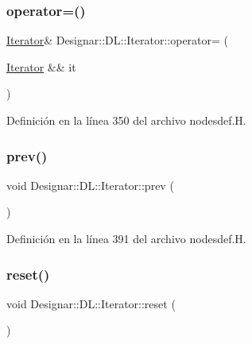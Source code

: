 \subsubsection{\texorpdfstring{operator=()}{operator=()}\hspace{0.1cm}{\footnotesize\ttfamily [2/2]}}
{\footnotesize\ttfamily \hyperlink{class_designar_1_1_d_l_1_1_iterator}{Iterator}\& Designar\+::\+D\+L\+::\+Iterator\+::operator= (\begin{DoxyParamCaption}\item[{\hyperlink{class_designar_1_1_d_l_1_1_iterator}{Iterator} \&\&}]{it }\end{DoxyParamCaption})\hspace{0.3cm}{\ttfamily [inline]}}



Definición en la línea 350 del archivo nodesdef.\+H.

\mbox{\label{class_designar_1_1_d_l_1_1_iterator_a8550a08d7c7645c8ec41ba209ee21893}} 
\subsubsection{\texorpdfstring{prev()}{prev()}}
{\footnotesize\ttfamily void Designar\+::\+D\+L\+::\+Iterator\+::prev (\begin{DoxyParamCaption}{ }\end{DoxyParamCaption})\hspace{0.3cm}{\ttfamily [inline]}}



Definición en la línea 391 del archivo nodesdef.\+H.

\mbox{\label{class_designar_1_1_d_l_1_1_iterator_a7708230beaa8a47d664878d37c11bbd3}} 
\subsubsection{\texorpdfstring{reset()}{reset()}}
{\footnotesize\ttfamily void Designar\+::\+D\+L\+::\+Iterator\+::reset (\begin{DoxyParamCaption}{ }\end{DoxyParamCaption})\hspace{0.3cm}{\ttfamily [inline]}}



